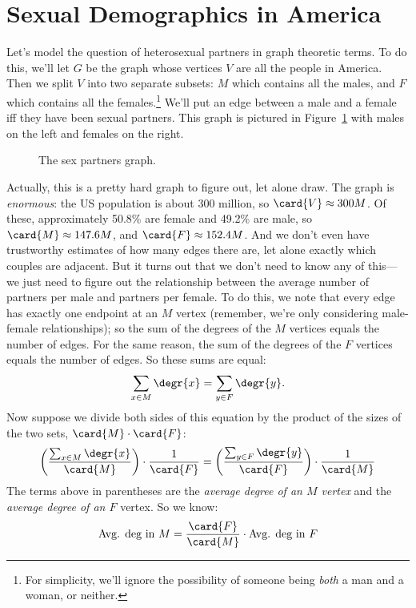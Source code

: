 \section{Sexual Demographics in America}\label{sexam}

Let's model the question of heterosexual partners in graph theoretic
terms.  To do this, we'll let $G$ be the graph whose vertices $V$
are all the people in America.  Then we split $V$ into two separate
subsets: $M$ which contains all the males, and $F$ which contains
all the females.\footnote{For simplicity, we'll ignore the possibility
  of someone being \emph{both} a man and a woman, or neither.}  We'll
put an edge between a male and a female iff they have been sexual
partners.  This graph is pictured in Figure~\ref{fig:partners} with
males on the left and females on the right.

\begin{figure}
\caption{The sex partners graph.}
\label{fig:partners}
\end{figure}

Actually, this is a pretty hard graph to figure out, let alone draw.
The graph is \emph{enormous}: the US population is about 300 million,
so $\card{V} \approx 300M$.  Of these, approximately 50.8\% are female
and 49.2\% are male, so $\card{M} \approx 147.6M$, and $\card{F}
\approx 152.4M$.  And we don't even have trustworthy estimates of how
many edges there are, let alone exactly which couples are adjacent.
But it turns out that we don't need to know any of this---we just need
to figure out the relationship between the average number of partners
per male and partners per female.  To do this, we note that every edge
has exactly one endpoint at an $M$ vertex (remember, we're only
considering male-female relationships); so the sum of the degrees of
the $M$ vertices equals the number of edges.  For the same reason, the
sum of the degrees of the $F$ vertices equals the number of edges.  So
these sums are equal:
%
\[
\sum_{x \in M} \degr{x} = \sum_{y \in F} \degr{y}.
\]
%
Now suppose we divide both sides of this equation by the product of the sizes of the
two sets, $\card{M} \cdot \card{F}$:
%
\[
\left(\frac{\sum_{x \in M} \degr{x}}{\card{M}}\right) \cdot \frac{1}{\card{F}} =
\left(\frac{\sum_{y \in F} \degr{y}}{\card{F}}\right) \cdot \frac{1}{\card{M}}
\]
The terms above in parentheses are the \emph{average degree of an $M$
  vertex} and the \emph{average degree of an $F$} vertex.  So we know:
\begin{equation}\label{avgsexMF}
\text{Avg. deg in $M$} = \frac{\card{F}}{\card{M}} \cdot \text{Avg. deg in $F$}
\end{equation}

